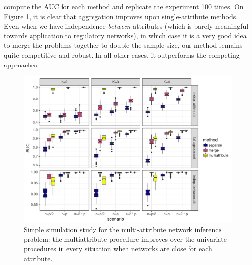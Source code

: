 compute the AUC for each method and replicate the experiment 100
times. On Figure \ref{fig:simu_multi}, it is clear that aggregation
improves upon single-attribute methods. Even when we have independence
\emph{between} attributes (which is barely meaningful towards
application to regulatory networks), in which case it is a very good
idea to merge the problems together to double the sample size, our
method remains quite competitive and robust. In all other cases, it
outperforms the competing approaches.
\begin{figure}[htbp!]
  \centering
  \includegraphics[width=\textwidth]{figures/res_simu_new}
  \caption{Simple simulation study for the multi-attribute network
    inference problem: the multiattribute procedure improves over the
    univariate procedures in every situation when networks are close
    for each attribute.}
  \label{fig:simu_multi}
\end{figure}
